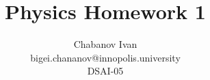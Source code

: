 

\begin{titlepage}
    \title{Physics Homework 1}
    \author{Chabanov Ivan\\bigei.chananov@innopolis.university\\DSAI-05}
    \maketitle

\end{titlepage}